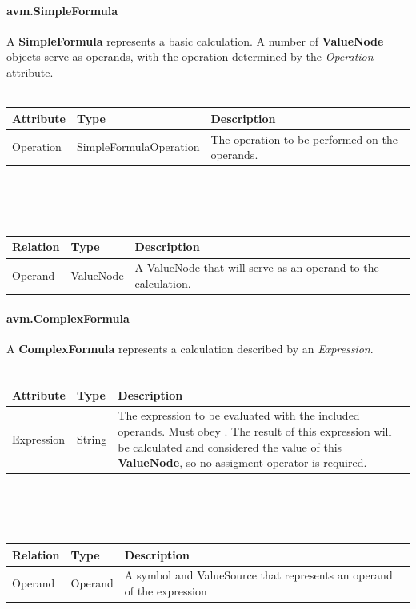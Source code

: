 \paragraph{avm.SimpleFormula}
A \textbf{SimpleFormula} represents a basic calculation. A number of \textbf{ValueNode} objects serve as operands, with the operation determined by the \textit{Operation} attribute.
\\ \\
\begin{tabular}{ l l p{9.5cm} }
\textbf{Attribute} & \textbf{Type} & \textbf{Description} \\ \hline
Operation & SimpleFormulaOperation & The operation to be performed on the operands. \\ \hline
\end{tabular}
\\ \\ \\
\begin{tabular}{ l l p{10cm} }
\textbf{Relation} & \textbf{Type} & \textbf{Description} \\ \hline
Operand & ValueNode & A ValueNode that will serve as an operand to the calculation. \\ \hline
\end{tabular}

\paragraph{avm.ComplexFormula}
A \textbf{ComplexFormula} represents a calculation described by an \textit{Expression}.
\\ \\
\begin{tabular}{ l l p{9.5cm} }
\textbf{Attribute} & \textbf{Type} & \textbf{Description} \\ \hline
Expression & String & The expression to be evaluated with the included operands. Must obey \textsc{\nameref{subsec:ComplexFormulaExpressionSyntax}}. The result of this expression will be calculated and considered the value of this \textbf{ValueNode}, so no assigment operator is required.\\ \hline
\end{tabular}
\\ \\ \\
\begin{tabular}{ l l p{10cm} }
\textbf{Relation} & \textbf{Type} & \textbf{Description} \\ \hline
Operand & Operand & A symbol and ValueSource that represents an operand of the expression \\ \hline
\end{tabular}

